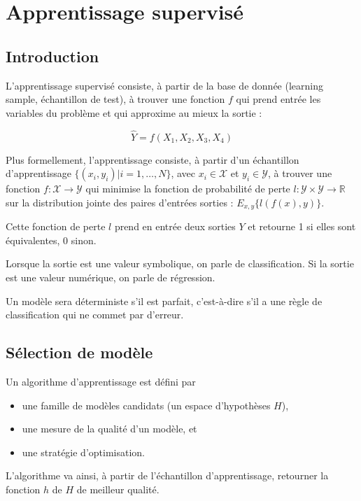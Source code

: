 \documentclass[10pt,a4paper]{report}
\newcommand{\ens}[1]{\lbrace #1 \rbrace}
\begin{document}
\chapter*{Apprentissage supervisé}
	
	\section{Introduction}
L'apprentissage supervisé consiste, à partir de la base de donnée (learning sample, échantillon de test), à trouver une fonction $f$ qui prend entrée les variables du problème et qui approxime au mieux la sortie :

$$\hat{Y} = f(X_1, X_2, X_3, X_4)$$

Plus formellement, l'apprentissage consiste, à partir d'un échantillon d'apprentissage $\ens{(x_i, y_i) \vert i = 1, \dots , N}$, avec $x_i \in \mathcal{X}$ et $y_i \in \mathcal{Y}$, à trouver une fonction $f : \mathcal{X} \rightarrow \mathcal{Y}$ qui minimise la fonction de probabilité de perte $l : \mathcal{Y} \times \mathcal{Y} \rightarrow \mathbb{R}$ sur la distribution jointe des paires d'entrées sorties : $E_{x, y} \ens{l(f(x), y)}$.

Cette fonction de perte $l$ prend en entrée deux sorties $Y$ et retourne 1 si elles sont équivalentes, 0 sinon.

Lorsque la sortie est une valeur symbolique, on parle de classification. Si la sortie est une valeur numérique, on parle de régression.

Un modèle sera déterministe s'il est parfait, c'est-à-dire s'il a une règle de classification qui ne commet par d'erreur.

	\section{Sélection de modèle}
	
	Un algorithme d'apprentissage est défini par
	
	\begin{itemize}
		\item une famille de modèles candidats (un espace d'hypothèses $H$),
		\item une mesure de la qualité d'un modèle, et
		\item une stratégie d'optimisation.
	\end{itemize}
	
	L'algorithme va ainsi, à partir de l'échantillon d'apprentissage, retourner la fonction $h$ de $H$ de meilleur qualité.
	
\end{document}
